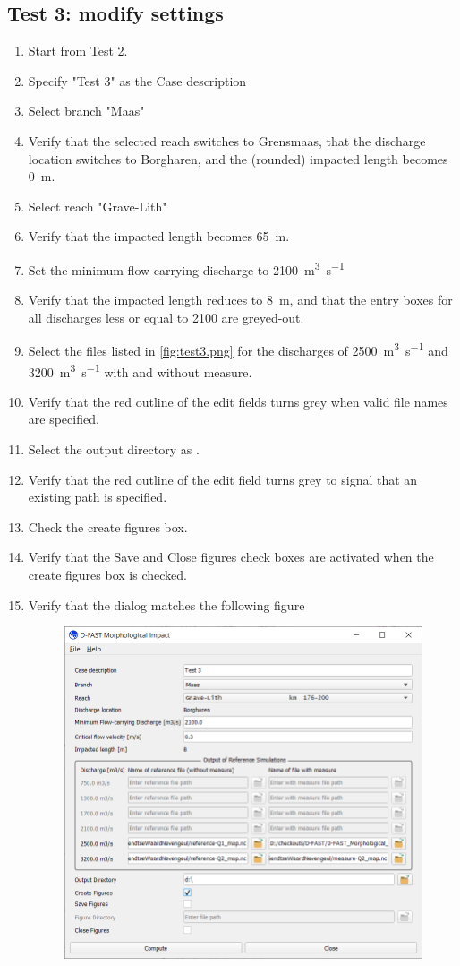 \subsection{Test 3: modify settings}
\begin{enumerate}
\item Start from Test 2.
\item Specify "Test 3" as the Case description
\item Select branch "Maas"
\item Verify that the selected reach switches to Grensmaas, that the discharge location switches to Borgharen, and the (rounded) impacted length becomes \SI{0}{\metre}.
\item Select reach "Grave-Lith"
\item Verify that the impacted length becomes \SI{65}{\metre}.
\item Set the minimum flow-carrying discharge to \SI{2100}{\metre\cubed\per\second}
\item Verify that the impacted length reduces to \SI{8}{\metre}, and that the entry boxes for all discharges less or equal to 2100 are greyed-out.
\item Select the files listed in \autoref{fig:test3.png} for the discharges of \SI{2500}{\metre\cubed\per\second} and \SI{3200}{\metre\cubed\per\second} with and without measure.
\item Verify that the red outline of the edit fields turns grey when valid file names are specified.
\item Select the output directory as .
\item Verify that the red outline of the edit field turns grey to signal that an existing path is specified.
\item Check the create figures box.
\item Verify that the Save and Close figures check boxes are activated when the create figures box is checked.
\item Verify that the dialog matches the following figure
\begin{figure}[H]
\center
\includegraphics[width=12cm]{figures/test3.png}

\end{figure}
\end{enumerate}

